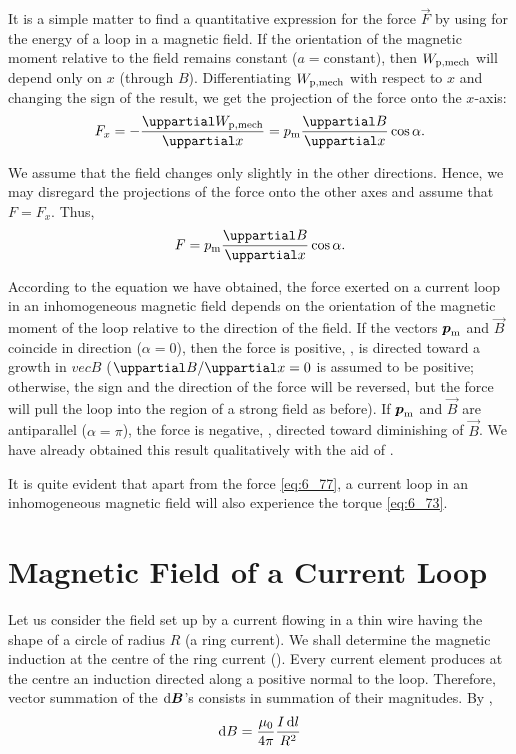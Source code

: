 It is a simple matter to find a quantitative expression for the force $\vec{F}$ by using  for the energy of a loop in a magnetic field. If the orientation of the magnetic moment relative to the field remains constant ($a=\text{constant}$), then $W_{\text{p,mech}}$ will depend only on $x$ (through $B$). Differentiating $W_{\text{p,mech}}$ with respect to $x$ and changing
the sign of the result, we get the projection of the force onto the $x$-axis:
\begin{equation*}
    F_x = - \diffpartial{\ab{W}{p,mech}}{x} = \ab{p}{m} \diffpartial{B}{x} \cos\alpha.
\end{equation*}

\noindent
We assume that the field changes only slightly in the other directions. Hence, we may disregard the projections of the force onto the other axes and assume that $F=F_x$. Thus,
\begin{equation}\label{eq:6_77}
    F = \ab{p}{m} \diffpartial{B}{x} \cos\alpha.
\end{equation}

According to the equation we have obtained, the force exerted on a current loop in an inhomogeneous magnetic field depends on the orientation of the magnetic moment of the loop relative to the direction of the field. If the vectors $\boldsymbol{p}_{\text{m}}$ and $\vec{B}$ coincide in direction ($\alpha=0$), then the force is positive, \ie, is directed toward a growth in $vec{B}$ ($\diffinpartial{B}{x}=0$ is assumed to be positive; otherwise, the sign and the direction of the force will be reversed, but the force will pull the loop into the region of a strong field as before). If $\boldsymbol{p}_{\text{m}}$ and $\vec{B}$ are antiparallel ($\alpha=\pi$), the force is negative, \ie, directed toward diminishing of $\vec{B}$. We have already obtained this result qualitatively with the aid of .

It is quite evident that apart from the force \eqref{eq:6_77}, a current loop in an inhomogeneous magnetic field will also experience the torque \eqref{eq:6_73}.

\section{Magnetic Field of a Current Loop}\label{sec:6_9}

Let us consider the field set up by a current flowing in a thin wire having the shape of a circle of radius $R$ (a ring current). We shall determine the magnetic induction at the centre of the ring current (). Every current element produces at the centre an induction directed along a positive normal to the loop. Therefore, vector summation of the $\mathrm{d}\boldsymbol{B}$'s consists in summation of their magnitudes. By ,
\begin{equation*}
    \mathrm{d} B = \frac{\mu_0}{4\pi} \frac{I\, \mathrm{d} l}{R^2}
\end{equation*}

